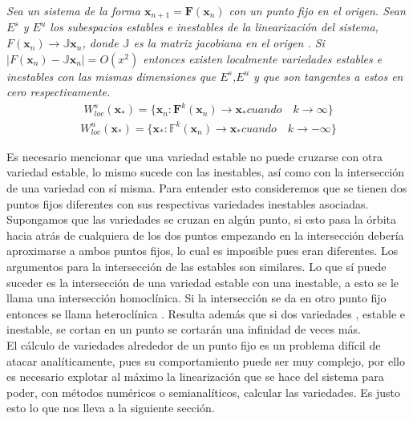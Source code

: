\begin{thm}
\textit{Sea un sistema de la forma $\pmb x_{n+1}=\mathbf{F}(\pmb x_{n})$ con un punto fijo en el origen. Sean $E^{s}$ y $E^{u}$ los subespacios estables e inestables de la linearización del sistema,$F(\pmb x_{n})\rightarrow\mathbb{J}\pmb x_{n}$,  donde $\mathbb{J}$ es la matriz jacobiana en el origen . Si $\mid F(\pmb x_{n})-\mathbb{J}\pmb x_{n}\mid =O(x^{2})$ entonces existen localmente variedades estables e inestables con las mismas dimensiones que $E^{s}$,$E^{u}$ y que son tangentes a estos en cero respectivamente.}
\begin{eqnarray*}
W^{s}_{loc}(\pmb x_{*})= \lbrace \pmb x_{n} : \mathbf{F}^{k}(\pmb x_{n})\rightarrow \pmb x_{*} cuando\quad k \rightarrow \infty \rbrace
\end{eqnarray*}
\begin{eqnarray*}
W^{u}_{loc}(\pmb x_{*}) = \lbrace \pmb x_{*} : \mathbb{F}^{k}(\pmb x_{n})\rightarrow \pmb x_{*} cuando\quad k \rightarrow -\infty \rbrace
\end{eqnarray*}
\end{thm}

Es necesario mencionar que una variedad estable no puede cruzarse con otra variedad estable, lo mismo sucede con las inestables, así como con la intersección de una variedad con sí misma. Para entender esto consideremos que se tienen dos puntos fijos diferentes con sus respectivas variedades inestables asociadas. Supongamos que las variedades se cruzan en algún punto, si esto pasa la órbita hacia atrás de cualquiera de los dos puntos empezando en la intersección debería aproximarse a ambos puntos fijos, lo cual es imposible pues eran diferentes. Los argumentos para la intersección de las estables son similares. Lo que sí puede suceder es la intersección de una variedad estable con una inestable, a esto se le llama una intersección homoclínica. Si la intersección se da en otro punto fijo entonces se llama heteroclínica \cite{Ott}. Resulta además que si dos variedades , estable e inestable, se cortan en un punto se cortarán una infinidad de veces más. \\


El cálculo de variedades alrededor de un punto fijo es un problema difícil de atacar analíticamente, pues su comportamiento puede ser muy complejo, por ello es necesario explotar al máximo la linearización que se hace del sistema para poder, con métodos numéricos o semianalíticos, calcular las variedades. Es justo esto lo que nos lleva a la siguiente sección.




